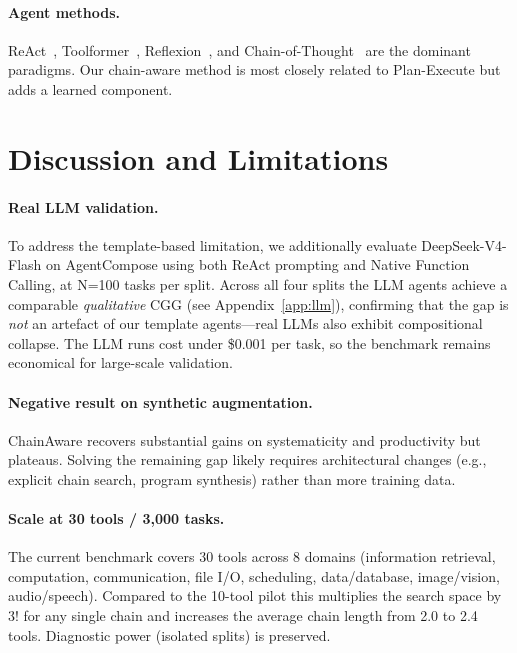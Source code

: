 \documentclass[10pt]{article}
\begin{document}
\paragraph{Agent methods.} ReAct~\citep{yao2023react}, Toolformer~\citep{schick2023toolformer}, Reflexion~\citep{shinn2023reflexion}, and Chain-of-Thought~\citep{wei2022chain} are the dominant paradigms. Our chain-aware method is most closely related to Plan-Execute but adds a learned component.

\section{Discussion and Limitations}
\label{sec:discussion}

\paragraph{Real LLM validation.} To address the template-based limitation, we additionally evaluate DeepSeek-V4-Flash on AgentCompose using both ReAct prompting and Native Function Calling, at N=100 tasks per split. Across all four splits the LLM agents achieve a comparable \emph{qualitative} CGG (see Appendix~\ref{app:llm}), confirming that the gap is \emph{not} an artefact of our template agents---real LLMs also exhibit compositional collapse. The LLM runs cost under \$0.001 per task, so the benchmark remains economical for large-scale validation.

\paragraph{Negative result on synthetic augmentation.} ChainAware recovers substantial gains on systematicity and productivity but plateaus. Solving the remaining gap likely requires architectural changes (e.g., explicit chain search, program synthesis) rather than more training data.

\paragraph{Scale at 30 tools / 3{,}000 tasks.} The current benchmark covers 30 tools across 8 domains (information retrieval, computation, communication, file I/O, scheduling, data/database, image/vision, audio/speech). Compared to the 10-tool pilot this multiplies the search space by $3!$ for any single chain and increases the average chain length from 2.0 to 2.4 tools. Diagnostic power (isolated splits) is preserved.
\end{document}
